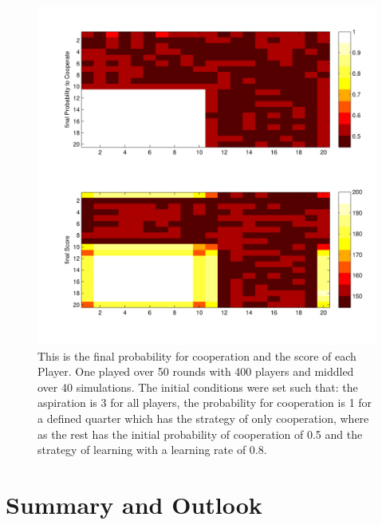 \documentclass[11pt]{article}
\begin{document}
\begin{figure}
\centering
\includegraphics[scale=0.6]{ScoreAndProbcoopWithImagesc33.pdf}
\caption[]{This is the final probability for cooperation and the score of each Player. One played over 50 rounds with 400 players and middled over 40 simulations. The initial conditions were set such that: the aspiration is 3 for all players, the probability for cooperation is 1 for a defined quarter which has the strategy of only cooperation, where as the rest has the initial probability of cooperation of 0.5 and the strategy of learning with a learning rate of 0.8. }
\label{exp33}
\end{figure}


\section{Summary and Outlook}
\end{document}
